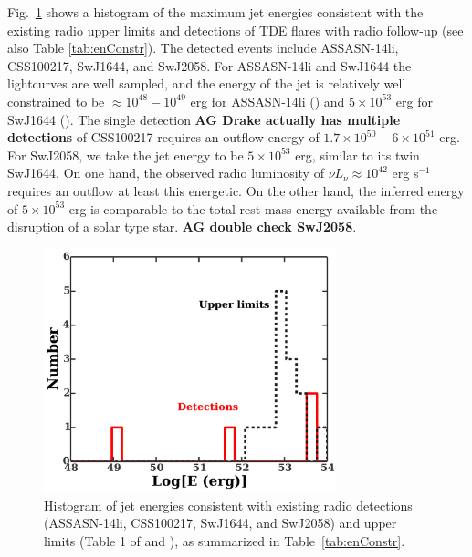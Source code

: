 \documentclass[usenatbib,fleqn]{mnras}
\begin{document}
Fig.~\ref{fig:hist} shows a histogram of the maximum jet energies
consistent with the existing radio upper limits and detections of TDE
flares with radio follow-up (see also Table \ref{tab:enConstr}).  The
detected events include ASSASN-14li, CSS100217, SwJ1644, and SwJ2058.
For ASSASN-14li and SwJ1644 the lightcurves are well sampled, and the
energy of the jet is relatively well constrained to be $\approx
10^{48}-10^{49}$ erg for ASSASN-14li (\citealt{van-Velzen+2015,
  Alexander+2015}) and $5\times 10^{53}$ erg for SwJ1644
(\citealt{Mimica+2015}).  The single detection {\bf AG Drake actually
  has multiple detections} of CSS100217 requires an outflow energy of
$1.7\times 10^{50}-6\times 10^{51}$ erg.  For SwJ2058, we take the jet
energy to be $5\times 10^{53}$ erg, similar to its twin SwJ1644.  On
one hand, the observed radio luminosity of $\nu L_{\nu }\approx
10^{42}$ erg s$^{-1}$ \citep{Cenko+2012} requires an outflow at least
this energetic.  On the other hand, the inferred energy of $5\times
10^{53}$ erg is comparable to the total rest mass energy available
from the disruption of a solar type star. {\bf AG double check
  SwJ2058}.

\begin{figure}
\includegraphics[width=8.5cm]{hist.pdf}
\caption{\label{fig:hist} Histogram of jet energies consistent with
  existing radio detections (ASSASN-14li, CSS100217, SwJ1644, and
  SwJ2058) and upper limits (Table 1 of \citealt{Mimica+2015} and
  \citealt{Arcavi+2014}), as summarized in Table~\ref{tab:enConstr}.}
\end{figure}
\end{document}
